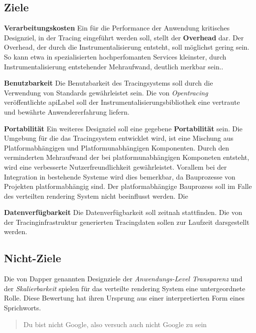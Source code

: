 \subsection{Ziele}
\label{subsection:Ziele}
\textbf{Verarbeitungskosten} \space\space\space Ein für die Performance der Anwendung kritisches Designziel, in der Tracing eingeführt werden soll, stellt der \textbf{Overhead} dar. Der Overhead, der durch die Instrumentalisierung entsteht, soll möglichst gering sein. So kann etwa in spezialisierten hochperfomanten Services kleinster, durch Instrumentalisierung entstehender Mehraufwand, deutlich merkbar sein.. 

\textbf{Benutzbarkeit} \space\space\space Die Benutzbarkeit des Tracingsystems soll durch die Verwendung von Standards gewährleistet sein. Die von \emph{Opentracing} veröffentlichte \gls{apiLabel} soll der Instrumentalisierungsbibliothek eine vertraute und bewährte Anwendererfahrung liefern. 

\textbf{Portabilität} \space\space\space Ein weiteres Designziel soll eine gegebene \textbf{Portabilität} sein. Die Umgebung für die das Tracingsystem entwicklet wird, ist eine Mischung aus Platformabhängigen und Platformunabhängigen Komponenten. Durch den verminderten Mehraufwand der bei platformunabhängigen Komponeten entsteht, wird eine verbesserte Nutzerfreundlichkeit gewährleistet. Vorallem bei der Integration in bestehende Systeme wird dies bemerkbar, da Bauprozesse von Projekten platformabhängig sind. Der platformabhängige Bauprozess soll im Falle des verteilten rendering System nicht beeinflusst werden. Die 

\textbf{Datenverfügbarkeit} \space\space\space Die Datenverfügbarkeit soll zeitnah stattfinden. Die von der Tracinginfrastruktur generierten Tracingdaten sollen zur Laufzeit darsgestellt werden. 

\subsection{Nicht-Ziele}
\label{subsection:Nicht-Ziele}

Die von Dapper genannten Designziele der \emph{Anwendungs-Level Transparenz} und der \emph{Skalierbarkeit} spielen für das verteilte rendering System eine untergeordnete Rolle. Diese Bewertung hat ihren Ursprung aus einer interpretierten Form eines Sprichworts. 

\begin{quote}
	Du bist nicht Google, also versuch auch nicht Google zu sein
\end{quote}

